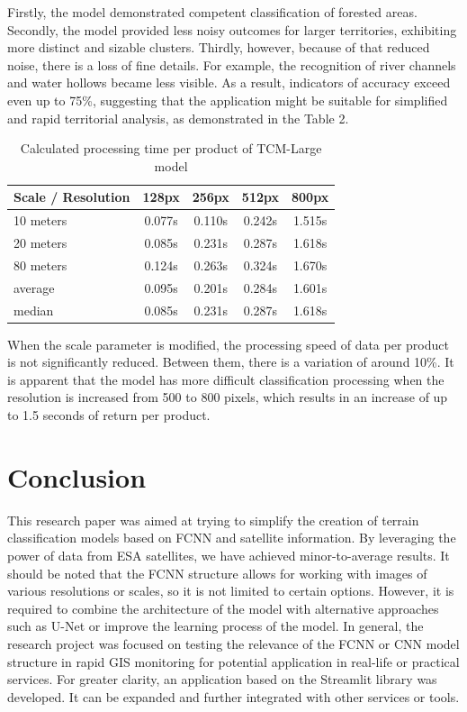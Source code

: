 \documentclass[conference]{IEEEtran}
\begin{document}
Firstly, the model demonstrated competent classification of forested areas. Secondly, the model provided less noisy outcomes for larger territories, exhibiting more distinct and sizable clusters. Thirdly, however, because of that reduced noise, there is a loss of fine details. For example, the recognition of river channels and water hollows became less visible. As a result, indicators of accuracy exceed even up to 75\%, suggesting that the application might be suitable for simplified and rapid territorial analysis, as demonstrated in the Table 2.

\begin{table}[htbp]
\centering
\caption{Calculated processing time per product of TCM-Large model}
\label{tab}
\begin{tabular}{l|c|c|c|c}
\toprule
\textbf{Scale / Resolution} & \textbf{128px} & \textbf{256px} & \textbf{512px} & \textbf{800px}\\
\midrule
10 meters & 0.077s & 0.110s & 0.242s & 1.515s\\
20 meters & 0.085s & 0.231s & 0.287s & 1.618s\\
80 meters & 0.124s & 0.263s & 0.324s & 1.670s\\
\bottomrule
average & 0.095s & 0.201s & 0.284s & 1.601s\\
median & 0.085s & 0.231s & 0.287s & 1.618s\\
\bottomrule
\end{tabular}
\end{table}

When the scale parameter is modified, the processing speed of data per product is not significantly reduced. Between them, there is a variation of around 10\%. It is apparent that the model has more difficult classification processing when the resolution is increased from 500 to 800 pixels, which results in an increase of up to 1.5 seconds of return per product.

\section{Conclusion}

This research paper was aimed at trying to simplify the creation of terrain classification models based on FCNN and satellite information. By leveraging the power of data from ESA satellites, we have achieved minor-to-average results. It should be noted that the FCNN structure allows for working with images of various resolutions or scales, so it is not limited to certain options. However, it is required to combine the architecture of the model with alternative approaches such as U-Net or improve the learning process of the model. In general, the research project was focused on testing the relevance of the FCNN or CNN model structure in rapid GIS monitoring for potential application in real-life or practical services. For greater clarity, an application based on the Streamlit library was developed. It can be expanded and further integrated with other services or tools.
\end{document}

